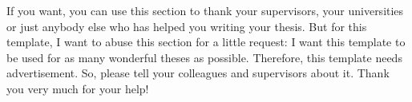 \documentclass[../main.tex]{subfiles}
\begin{document}
\thispagestyle{empty}

\vspace*{2cm}

\begin{center}
 { \myAcknowTitle}
\end{center}

\vspace{1cm}
\noindent
If you want, you can use this section to thank your supervisors, your universities or just anybody else who has helped you writing your thesis.
But for this template, I want to abuse this section for a little request:
I want this template to be used for as many wonderful theses as possible.
Therefore, this template needs advertisement.
So, please tell your colleagues and supervisors about it.
Thank you very much for your help!
\end{document}
